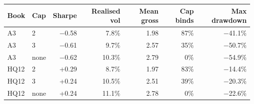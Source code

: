\begin{tabular}{llrrrrr}
\toprule
Book & Cap & Sharpe & Realised vol & Mean gross & Cap binds & Max drawdown \\
\midrule
A3 & 2 & $-$0.58 & 7.8\% & 1.98 & 87\% & $-$41.1\% \\
A3 & 3 & $-$0.61 & 9.7\% & 2.57 & 35\% & $-$50.7\% \\
A3 & none & $-$0.62 & 10.3\% & 2.79 & 0\% & $-$54.9\% \\
HQ12 & 2 & +0.29 & 8.7\% & 1.97 & 83\% & $-$14.4\% \\
HQ12 & 3 & +0.24 & 10.5\% & 2.51 & 39\% & $-$20.3\% \\
HQ12 & none & +0.24 & 11.1\% & 2.78 & 0\% & $-$22.6\% \\
\bottomrule
\end{tabular}
